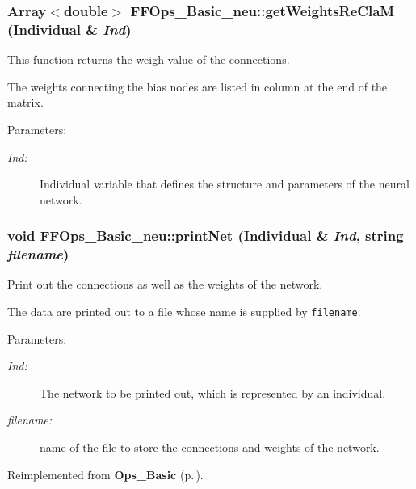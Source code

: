 \subsubsection{\setlength{\rightskip}{0pt plus 5cm}Array$<$double$>$ FFOps\_\-Basic\_\-neu::get\-Weights\-Re\-Cla\-M (Individual \& {\em Ind})}\label{classFFOps__Basic__neu_a3}


This function returns the weigh value of the connections.

The weights connecting the bias nodes are listed in column at the end of the matrix. \begin{Desc}
\item[Parameters: ]\par
\begin{description}
\item[{\em 
Ind:}]Individual variable that defines the structure and parameters of the neural network. \end{description}
\end{Desc}
\subsubsection{\setlength{\rightskip}{0pt plus 5cm}void FFOps\_\-Basic\_\-neu::print\-Net (Individual \& {\em Ind}, string {\em filename})}\label{classFFOps__Basic__neu_a6}


Print out the connections as well as the weights of the network.

The data are printed out to a file whose name is supplied by {\tt filename}. \begin{Desc}
\item[Parameters: ]\par
\begin{description}
\item[{\em 
Ind:}]The network to be printed out, which is represented by an individual. \item[{\em 
filename:}]name of the file to store the connections and weights of the network. \end{description}
\end{Desc}


Reimplemented from {\bf Ops\_\-Basic} {\rm (p.\,\pageref{classOps__Basic_a11})}.
